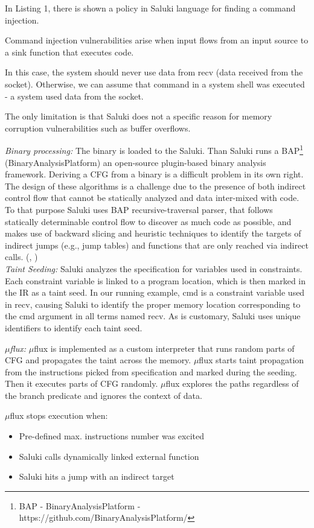 \documentclass[a4paper, 12pt, journal, onecolumn]{IEEEtran}
\begin{document}
In Listing 1, there is shown a policy in Saluki language for finding a command injection. 

Command injection vulnerabilities arise when input flows from an input source to a sink function that executes code. 

In this case, the system should never use data from recv (data received from the socket). Otherwise, we can assume that command in a system shell was executed - a system used data from the socket. 

The only limitation is that Saluki does not a specific reason for memory corruption vulnerabilities such as buffer overflows.
\bigskip

\textit{Binary processing:} The binary is loaded to the Saluki. Than Saluki runs a BAP\footnote{BAP - BinaryAnalysisPlatform - https://github.com/BinaryAnalysisPlatform/} (BinaryAnalysisPlatform) an open-source plugin-based binary analysis framework. Deriving a CFG from a binary is a difficult problem in its own right. The design of these algorithms is a challenge due to the presence of both indirect control flow that cannot be statically analyzed and data inter-mixed with code.\cite{CFG} To that purpose Saluki uses BAP recursive-traversal parser, that follows statically determinable control flow to discover as much code as possible, and makes use of backward slicing and heuristic techniques to identify the targets of indirect jumps (e.g., jump tables) and functions that are only reached via indirect calls. (\cite{a8}, \cite{BAP})
\\

\textit{Taint Seeding:} Saluki analyzes the specification for variables used in constraints. Each constraint variable is linked to
a program location, which is then marked in the IR as a taint
seed. In our running example, cmd is a constraint variable used
in recv, causing Saluki to identify the proper memory location
corresponding to the cmd argument in all terms named recv.
As is customary, Saluki uses unique identifiers to identify each
taint seed.\cite{saluki}
\bigskip

\textit{$\mu$flux:} $\mu$flux is implemented as a custom interpreter that runs random parts of CFG and propagates the taint across the memory. $\mu$flux starts taint propagation from the instructions picked from specification and marked during the seeding. Then it executes parts of CFG randomly. $\mu$flux explores the paths regardless of the branch predicate and ignores the context of data.
\medskip

$\mu$flux stops execution when:
\begin{itemize}
\item Pre-defined max. instructions number was excited
\item Saluki calls dynamically linked external function
\item Saluki hits a jump with an indirect target
\end{itemize}
\end{document}
